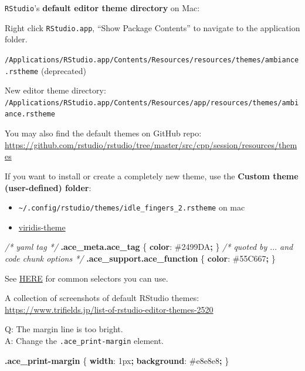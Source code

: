 \documentclass[
  a4paper,
  twoside,
  openright]{book}
\newenvironment{Shaded}{\begin{snugshade}}{\end{snugshade}}
\newcommand{\CharTok}[1]{\textcolor[rgb]{0.31,0.60,0.02}{#1}}
\newcommand{\CommentTok}[1]{\textcolor[rgb]{0.56,0.35,0.01}{\textit{#1}}}
\newcommand{\ConstantTok}[1]{\textcolor[rgb]{0.56,0.35,0.01}{#1}}
\newcommand{\DataTypeTok}[1]{\textcolor[rgb]{0.13,0.29,0.53}{#1}}
\newcommand{\DecValTok}[1]{\textcolor[rgb]{0.00,0.00,0.81}{#1}}
\newcommand{\FunctionTok}[1]{\textcolor[rgb]{0.13,0.29,0.53}{\textbf{#1}}}
\newcommand{\KeywordTok}[1]{\textcolor[rgb]{0.13,0.29,0.53}{\textbf{#1}}}
\newcommand{\NormalTok}[1]{#1}
\newcommand{\OperatorTok}[1]{\textcolor[rgb]{0.81,0.36,0.00}{\textbf{#1}}}
\providecommand{\tightlist}{%
  \setlength{\itemsep}{0pt}\setlength{\parskip}{0pt}}
\theoremstyle{definition}
\theoremstyle{definition}
\theoremstyle{definition}
\theoremstyle{definition}
\theoremstyle{remark}
\begin{document}
\texttt{RStudio}'s \textbf{default editor theme directory} on Mac:

Right click \texttt{RStudio.app}, ``Show Package Contents'' to navigate to the application folder.

\texttt{/Applications/RStudio.app/Contents/Resources/resources/themes/ambiance.rstheme} (deprecated)

New editor theme directory: \texttt{/Applications/RStudio.app/Contents/Resources/app/resources/themes/ambiance.rstheme}

You may also find the default themes on GitHub repo: \url{https://github.com/rstudio/rstudio/tree/master/src/cpp/session/resources/themes}

If you want to install or create a completely new theme, use the \textbf{Custom theme (user-defined) folder}:

\begin{itemize}
\tightlist
\item
  \texttt{\textasciitilde{}/.config/rstudio/themes/idle\_fingers\_2.rstheme} on mac
\item
  \href{https://github.com/z3tt/viridis-theme/blob/main/viridis.rstheme}{viridis-theme}
\end{itemize}

\begin{Shaded}
\begin{Highlighting}[]
\CommentTok{/* yaml tag */}
\FunctionTok{.ace\_meta.ace\_tag}\NormalTok{ \{}
  \KeywordTok{color}\CharTok{:} \ConstantTok{\#2499DA}\OperatorTok{;}
\NormalTok{\}}
\CommentTok{/* quoted by $...$ and code chunk options */}
\FunctionTok{.ace\_support.ace\_function}\NormalTok{ \{}
  \KeywordTok{color}\CharTok{:} \ConstantTok{\#55C667}\OperatorTok{;}
\NormalTok{\}}
\end{Highlighting}
\end{Shaded}

See \href{https://docs.posit.co/ide/user/ide/guide/ui/appearance.html\#creating-an-rstheme}{HERE} for common selectors you can use.

A collection of screenshots of default RStudio themes: \url{https://www.trifields.jp/list-of-rstudio-editor-themes-2520}

Q: The margin line is too bright.\\
A: Change the \texttt{.ace\_print-margin} element.

\begin{Shaded}
\begin{Highlighting}[]
\FunctionTok{.ace\_print{-}margin}\NormalTok{ \{}
  \KeywordTok{width}\CharTok{:} \DecValTok{1}\DataTypeTok{px}\OperatorTok{;}
  \KeywordTok{background}\CharTok{:} \ConstantTok{\#e8e8e8}\OperatorTok{;}
\NormalTok{\}}
\end{Highlighting}
\end{Shaded}
\end{document}
